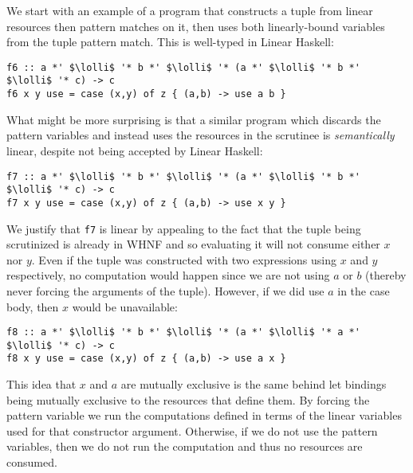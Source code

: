 \documentclass[acmsmall,review,anonymous]{acmart}
\newcommand{\incode}[1]{\lstinline{#1}}
\newcommand{\lolli}{\multimap}
\begin{document}
We start with an
example of a program that constructs a tuple from linear resources then pattern
matches on it, then uses both linearly-bound variables from the tuple pattern
match. This is well-typed in Linear Haskell:
\begin{working}
\begin{lstlisting}
f6 :: a *' $\lolli$ '* b *' $\lolli$ '* (a *' $\lolli$ '* b *' $\lolli$ '* c) -> c
f6 x y use = case (x,y) of z { (a,b) -> use a b }
\end{lstlisting}
\end{working}
What might be more surprising is that a similar program which discards the
pattern variables and instead uses the resources in the scrutinee is 
\emph{semantically} linear, despite not being accepted by Linear Haskell:
\begin{notyet}
\begin{lstlisting}
f7 :: a *' $\lolli$ '* b *' $\lolli$ '* (a *' $\lolli$ '* b *' $\lolli$ '* c) -> c
f7 x y use = case (x,y) of z { (a,b) -> use x y }
\end{lstlisting}
\end{notyet}
We justify that \incode{f7} is linear by appealing to the fact that 
the tuple being scrutinized is already in WHNF and so evaluating it will
not consume either $x$ nor $y$. Even if the tuple was constructed with
two expressions using $x$ and $y$ respectively, no computation would happen
since we are not using $a$ or $b$ (thereby never forcing the arguments
of the tuple). However, if we did use $a$ in the case body, then $x$ would be unavailable:
\begin{noway}
\begin{lstlisting}
f8 :: a *' $\lolli$ '* b *' $\lolli$ '* (a *' $\lolli$ '* a *' $\lolli$ '* c) -> c
f8 x y use = case (x,y) of z { (a,b) -> use a x }
\end{lstlisting}
\end{noway}
This idea that $x$ and $a$ are mutually exclusive is the same behind let
bindings being mutually exclusive to the resources that define them.
By forcing the pattern variable we run the computations
defined in terms of the linear variables used for that constructor
argument. Otherwise, if we do not use the pattern variables, then we
do not run the computation and thus no resources are consumed.
\end{document}
